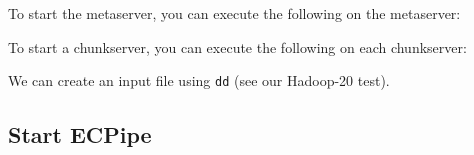\documentclass[letterpaper,12pt]{article}
\begin{document}
To start the metaserver, you can execute the following on the metaserver:

\begin{center}
\noindent{}
\end{center}

To start a chunkserver, you can execute the following on each chunkserver:

\begin{center}
\noindent{}
\end{center}

We can create an input file using {\tt dd} (see our Hadoop-20 test).

\begin{center}
\noindent{}
\end{center}

\subsection{Start ECPipe}
\end{document}
